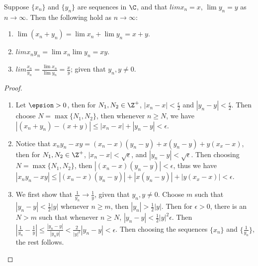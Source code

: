 \begin{theorem}\label{3.1.2}
    Suppose $\{x_n\}$ and  $\{y_n\}$ are sequences in  $\C$, and that  $lim{x_n}=x$, 
    $\lim{y_n}=y$ as  $n \rightarrow \infty$. Then the following hold as  $n \rightarrow \infty$:
         \begin{enumerate}[label=(\arabic*)]
             \item $\lim{(x_n+y_n)}=\lim{x_n}+\lim{y_n}=x+y$.

             \item $lim{x_ny_n}=\lim{x_n}\lim{y_n}=xy$.

             \item $lim{\frac{x_n}{y_n}}=\frac{\lim{x_n}}{\lim{y_n}}=\frac{x}{y}$; 
                 given that $y_n, y \neq 0$.
        \end{enumerate}
\end{theorem}
\begin{proof}
    \begin{enumerate}[label=(\arabic*)]
        \item Let $\epsion>0$, then for  $N_1, N_2 \in \Z^+$, $|x_n-x|<\frac{\epsilon}{2}$ and 
            $|y_n-y|<\frac{\epsilon}{2}$. Then choose $N=\max\{N_1,N_2\}$, then whenever $n \geq N$, 
            we have  $|(x_n+y_n)-(x+y)| \leq |x_n-x|+|y_n-y|<\epsilon$.

        \item Notice that $x_ny_n-xy=(x_n-x)(y_n-y)+x(y_n-y)+y(x_x-x)$, then for  
            $N_1,N_2 \in \Z^+$, $|x_n-x|<\sqrt{\epsilon}$, and  $|y_n-y|<\sqrt{\epsilon}$. Then 
            choosing  $N=\max\{N_1,N_2\}$, then $|(x_n-x)(y_n-y)|<\epsilon$, thus 
            we have $|x_ny_n-xy|\leq |(x_n-x)(y_n-y)|+|x(y_n-y)|+|y(x_x-x)|<\epsilon$.

        \item We first show that $\frac{1}{y_n} \rightarrow \frac{1}{y}$, given that $y_n,y \neq 0$. 
            Choose  $m$ such that  $|y_n-y|<\frac{1}{2}|y|$ whenever $n \geq m$, then 
            $|y_n|>\frac{1}{2}|y|$. Then for $\epsilon>0$, there is an  $N>m$ such that whenever  $n \geq N$, 
             $|y_n-y|<\frac{1}{2}|y|^2\epsilon$. Then $|\frac{1}{y_n}-\frac{1}{y}| \leq 
             \frac{|y_n-y|}{|y_ny|}<\frac{2}{|y|^2}|y_n-y|<\epsilon$. Then choosing the sequences 
             $\{x_n\}$ and  $\{\frac{1}{y_n}\}$, the rest follows.
    \end{enumerate}
\end{proof}

